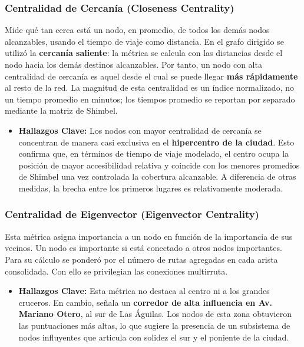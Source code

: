         \subsubsection{Centralidad de Cercanía (Closeness Centrality)}
            Mide qué tan cerca está un nodo, en promedio, de todos los demás nodos alcanzables, usando el tiempo de viaje como distancia. En el grafo dirigido se utilizó la \textbf{cercanía saliente}: la métrica se calcula con las distancias desde el nodo hacia los demás destinos alcanzables. Por tanto, un nodo con alta centralidad de cercanía es aquel desde el cual se puede llegar \textbf{más rápidamente} al resto de la red. La magnitud de esta centralidad es un índice normalizado, no un tiempo promedio en minutos; los tiempos promedio se reportan por separado mediante la matriz de Shimbel.
            \begin{itemize}
                \item \textbf{Hallazgos Clave:} Los nodos con mayor centralidad de cercanía se concentran de manera casi exclusiva en el \textbf{hipercentro de la ciudad}. Esto confirma que, en términos de tiempo de viaje modelado, el centro ocupa la posición de mayor accesibilidad relativa y coincide con los menores promedios de Shimbel una vez controlada la cobertura alcanzable. A diferencia de otras medidas, la brecha entre los primeros lugares es relativamente moderada.
            \end{itemize}

        \subsubsection{Centralidad de Eigenvector (Eigenvector Centrality)}
            Esta métrica asigna importancia a un nodo en función de la importancia de sus vecinos. Un nodo es importante si está conectado a otros nodos importantes. Para su cálculo se ponderó por el número de rutas agregadas en cada arista consolidada. Con ello se privilegian las conexiones multirruta.
            \begin{itemize}
                \item \textbf{Hallazgos Clave:} Esta métrica no destaca al centro ni a los grandes cruceros. En cambio, señala un \textbf{corredor de alta influencia en Av. Mariano Otero}, al sur de Las Águilas. Los nodos de esta zona obtuvieron las puntuaciones más altas, lo que sugiere la presencia de un subsistema de nodos influyentes que articula con solidez el sur y el poniente de la ciudad.
            \end{itemize}

